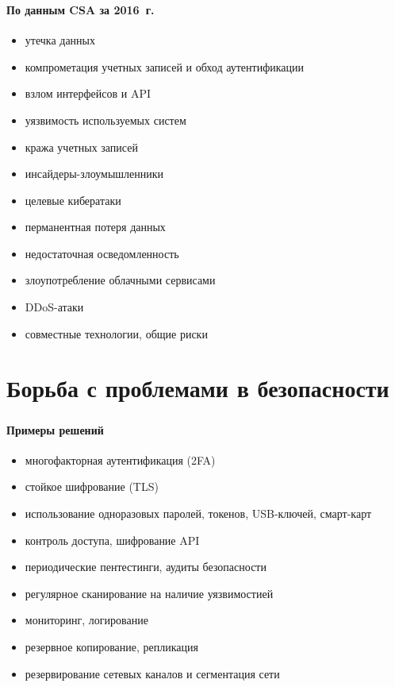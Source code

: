 \begin{frame}
\frametitle{\insertsection}
\framesubtitle{По данным CSA за 2016~г.}

\begin{itemize}
    \item утечка данных
    \item компрометация учетных записей и обход аутентификации
    \item взлом интерфейсов и API
    \item уязвимость используемых систем
    \item кража учетных записей
    \item инсайдеры-злоумышленники
    \item целевые кибератаки
    \item перманентная потеря данных
    \item недостаточная осведомленность
    \item злоупотребление облачными сервисами
    \item DDoS-атаки
    \item совместные технологии, общие риски
\end{itemize}
\end{frame}


\section{Борьба с проблемами в безопасности}

\begin{frame}
\frametitle{\insertsection}
\framesubtitle{Примеры решений}

\begin{itemize}
    \item многофакторная аутентификация (2FA)
    \item стойкое шифрование (TLS)
    \item использование одноразовых паролей, токенов, USB-ключей, смарт-карт
    \item контроль доступа, шифрование API
    \item периодические пентестинги, аудиты безопасности
    \item регулярное сканирование на наличие уязвимостией
    \item мониторинг, логирование
    \item резервное копирование, репликация
    \item резервирование сетевых каналов и сегментация сети
\end{itemize}
\end{frame}

